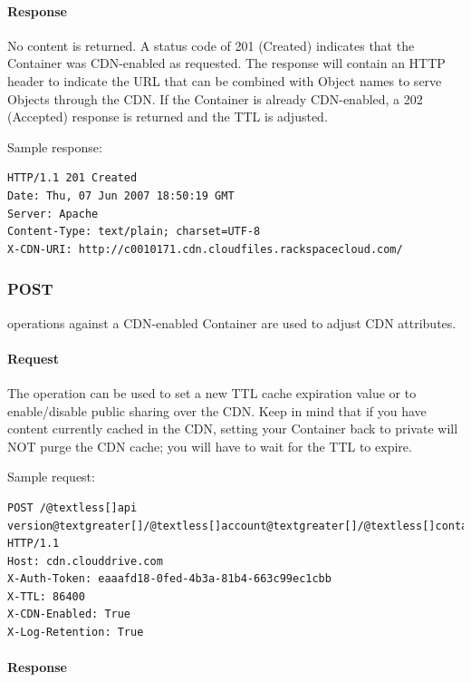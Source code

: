 \documentclass[letterpaper,10pt,english]{manual}
\begin{document}
\paragraph{Response}

No content is returned. A status code of 201 (Created) indicates that
the Container was CDN-enabled as requested. The response will contain
an HTTP header to indicate the URL that can be combined with Object names
to serve Objects through the CDN.  If the Container is already
CDN-enabled, a 202 (Accepted) response is returned and the TTL is
adjusted.

Sample response:

\begin{Verbatim}[commandchars=@\[\]]
HTTP/1.1 201 Created
Date: Thu, 07 Jun 2007 18:50:19 GMT
Server: Apache
Content-Type: text/plain; charset=UTF-8
X-CDN-URI: http://c0010171.cdn.cloudfiles.rackspacecloud.com/
\end{Verbatim}


\subsubsection{POST}

 operations against a CDN-enabled Container are used to adjust
CDN attributes.


\paragraph{Request}

The  operation can be used to set a new TTL cache expiration value or
to enable/disable public sharing over the CDN.  Keep in mind that if
you have content currently cached in the CDN, setting your Container
back to private will NOT purge the CDN cache; you will have to wait for
the TTL to expire.

Sample request:

\begin{Verbatim}[commandchars=@\[\]]
POST /@textless[]api version@textgreater[]/@textless[]account@textgreater[]/@textless[]container@textgreater[] HTTP/1.1
Host: cdn.clouddrive.com
X-Auth-Token: eaaafd18-0fed-4b3a-81b4-663c99ec1cbb
X-TTL: 86400
X-CDN-Enabled: True
X-Log-Retention: True
\end{Verbatim}


\paragraph{Response}
\end{document}
